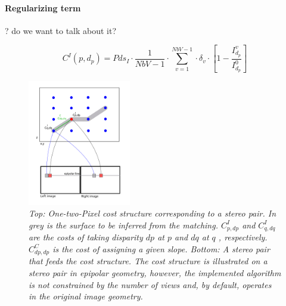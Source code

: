 \documentclass[journal]{IEEEtran}
\begin{document}
\paragraph{Regularizing term}
? do we want to talk about it?
%
%
\begin{figure}[H]
\begin{equation}\label{eq:cost}
C^I(p,d_p) = Pds_{I} \cdot \frac{1}{NbV-1} \cdot \sum_{v=1}^{NbV-1} \cdot \delta_v \cdot \left[ 1 - \frac{I_{d_p}^v}{I_{d_p}^0} \right]
\end{equation}
\end{figure}
%
\begin{figure}[h]
\centering
\includegraphics[width=0.4\textwidth]{cost_12Pix-2-v5.png} \caption{\textit{Top: One-two-Pixel cost structure corresponding to a stereo pair. In grey is the surface to be inferred from the matching. $C^I_{p,dp}$ and $C^I_{q,dq}$ are the costs of taking disparity $dp$ at $p$ and $dq$ at $q$ , respectively. $C^C_{dp,dp}$ is the cost of assigning a given slope. Bottom: A stereo pair that feeds the cost structure. The cost structure is illustrated on a stereo pair in epipolar geometry, however, the implemented algorithm is not constrained by the number of views and, by default, operates in the original image geometry.}}\label{fig:costCubeStereo}
\end{figure}
% 
\end{document}
